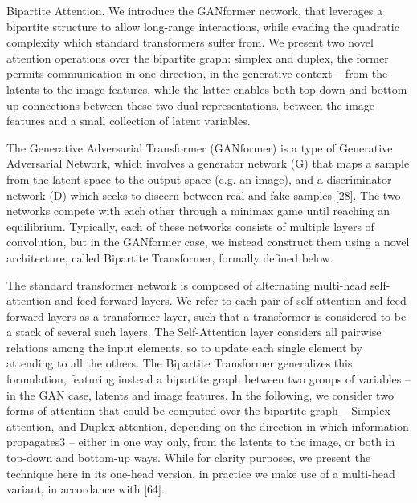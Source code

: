 \documentclass{article}
\begin{document}
	Bipartite Attention. We introduce the GANformer network, that leverages a bipartite structure to 
	allow long-range interactions, while evading the quadratic complexity which standard transformers 
	suffer from. We present two novel attention operations over the bipartite graph: simplex and duplex, 
	the former permits communication in one direction, in the generative context – from the latents to 
	the image features, while the latter enables both top-down and bottom up connections between 
	these two dual representations.
	between the image features and a small collection of latent variables.
	
	The Generative Adversarial Transformer (GANformer) is a type of Generative Adversarial Network, 
	which involves a generator network (G) that maps a sample from the latent space to the output 
	space (e.g. an image), and a discriminator network (D) which seeks to discern between real and 
	fake samples [28]. The two networks compete with each other through a minimax game until 
	reaching an equilibrium. Typically, each of these networks consists of multiple layers of 
	convolution, but in the GANformer case, we instead construct them using a novel architecture, 
	called Bipartite Transformer, formally defined below.
	
	The standard transformer network is composed of alternating multi-head self-attention and 
	feed-forward layers. We refer to each pair of self-attention and feed-forward layers as a transformer 
	layer, such that a transformer is considered to be a stack of several such layers. The Self-Attention 
	layer considers all pairwise relations among the input elements, so to update each single element by 
	attending to all the others. The Bipartite Transformer generalizes this formulation, featuring 
	instead a bipartite graph between two groups of variables – in the GAN case, latents and image 
	features. In the following, we consider two forms of attention that could be computed over the 
	bipartite graph – Simplex attention, and Duplex attention, depending on the direction in which 
	information propagates3 – either in one way only, from the latents to the image, or both in 
	top-down and bottom-up ways. While for clarity purposes, we present the technique here in its 
	one-head version, in practice we make use of a multi-head variant, in accordance with [64].
	
\end{document}
